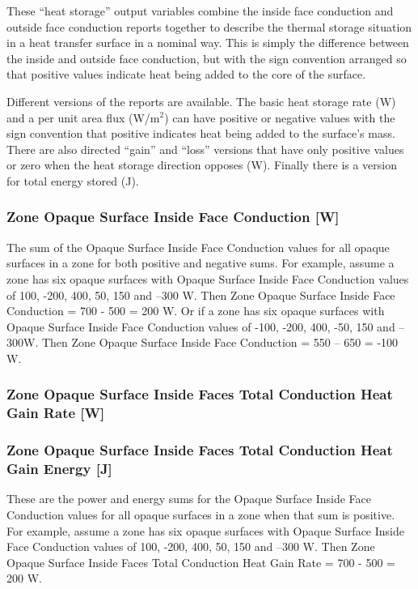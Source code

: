 These ``heat storage'' output variables combine the inside face conduction and outside face conduction reports together to describe the thermal storage situation in a heat transfer surface in a nominal way. This is simply the difference between the inside and outside face conduction, but with the sign convention arranged so that positive values indicate heat being added to the core of the surface.

Different versions of the reports are available. The basic heat storage rate (W) and a per unit area flux (W/m\(^{2}\)) can have positive or negative values with the sign convention that positive indicates heat being added to the surface's mass. There are also directed ``gain'' and ``loss'' versions that have only positive values or zero when the heat storage direction opposes (W). Finally there is a version for total energy stored (J).

\subsubsection{Zone Opaque Surface Inside Face Conduction {[}W{]}}\label{zone-opaque-surface-inside-face-conduction-w}

The sum of the Opaque Surface Inside Face Conduction values for all opaque surfaces in a zone for both positive and negative sums. For example, assume a zone has six opaque surfaces with Opaque Surface Inside Face Conduction values of 100, -200, 400, 50, 150 and --300 W. Then Zone Opaque Surface Inside Face Conduction = 700 - 500 = 200 W. Or if a zone has six opaque surfaces with Opaque Surface Inside Face Conduction values of -100, -200, 400, -50, 150 and --300W. Then Zone Opaque Surface Inside Face Conduction = 550 -- 650 = -100 W.

\subsubsection{Zone Opaque Surface Inside Faces Total Conduction Heat Gain Rate {[}W{]}}\label{zone-opaque-surface-inside-faces-total-conduction-heat-gain-rate-w}

\subsubsection{Zone Opaque Surface Inside Faces Total Conduction Heat Gain Energy {[}J{]}}\label{zone-opaque-surface-inside-faces-total-conduction-heat-gain-energy-j}

These are the power and energy sums for the Opaque Surface Inside Face Conduction values for all opaque surfaces in a zone when that sum is positive. For example, assume a zone has six opaque surfaces with Opaque Surface Inside Face Conduction values of 100, -200, 400, 50, 150 and --300 W. Then Zone Opaque Surface Inside Faces Total Conduction Heat Gain Rate = 700 - 500 = 200 W.

